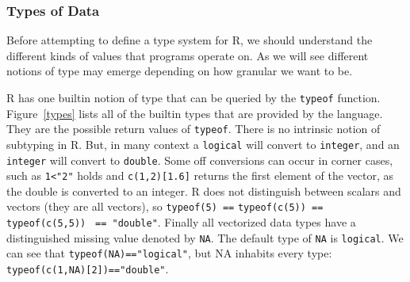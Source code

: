 \documentclass[acmsmall,review,anonymous]{acmart}\settopmatter{printfolios=true,printccs=false,printacmref=false}
\newcommand{\code}[1]{{\lstinline[style=Rin]!#1!}\xspace}
\begin{document}
\subsubsection{Types of Data}
\label{subsubsec:backgroundtypes}

Before attempting to define a type system for R, we should understand the
different kinds of values that programs operate on.  As we will see
different notions of type may emerge depending on how granular we want to
be.

\renewcommand{\k}[1]{{\tt #1}\xspace}

R has one builtin notion of type that can be queried by the \k{typeof}
function. Figure~\ref{types} lists all of the builtin types that are
provided by the language. They are the possible return values of
\k{typeof}. There is no intrinsic notion of subtyping in R. But, in many
context a \k{logical} will convert to \k{integer}, and an \k{integer} will
convert to \k{double}.  Some off conversions can occur in corner cases, such
as \k{1<"2"} holds and \k{c(1,2)[1.6]} returns the first element of the
vector, as the double is converted to an integer. R does not distinguish
between scalars and vectors (they are all vectors), so \code{typeof(5) ==}
\code{typeof(c(5)) == typeof(c(5,5))} \code{ == "double"}. Finally all
vectorized data types have a distinguished missing value denoted by
\code{NA}. The default type of \code{NA} is \k{logical}. We can see that
\code{typeof(NA)=="logical"}, but NA inhabits every type:
\code{typeof(c(1,NA)[2])=="double"}.
\end{document}
